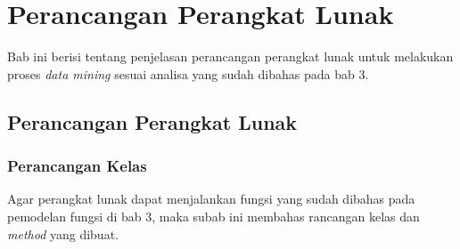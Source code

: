 \chapter{Perancangan Perangkat Lunak}

Bab ini berisi tentang penjelasan perancangan perangkat lunak untuk melakukan proses \textsl{data mining} sesuai analisa yang sudah dibahas pada bab 3.

\section{Perancangan Perangkat Lunak}

\subsection{Perancangan Kelas}
Agar perangkat lunak dapat menjalankan fungsi yang sudah dibahas pada pemodelan fungsi di bab 3, maka subab ini membahas rancangan kelas dan \textsl{method} yang dibuat.

